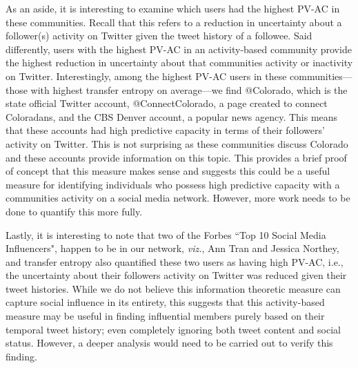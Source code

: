 As an aside, it is interesting to examine which users had the highest PV-AC in these communities. Recall that this refers to a reduction in uncertainty about a follower(s) activity on Twitter given the tweet history of a followee. Said differently, users with the highest PV-AC in an activity-based community provide the highest reduction in uncertainty about that communities activity or inactivity on Twitter.
Interestingly, among the highest PV-AC users in these communities---those with highest transfer entropy on average---we find @Colorado, which is the state official Twitter account, @ConnectColorado, a page created to connect Coloradans, and the CBS Denver account, a popular news agency. This means that these accounts had high predictive capacity in terms of their followers' activity on Twitter. This is not surprising as these communities discuss Colorado and these accounts provide information on this topic. This provides a brief proof of concept that this measure makes sense and suggests this could be a useful measure for identifying individuals who possess high predictive capacity with a communities activity on a social media network. However, more work needs to be done to quantify this more fully. 

Lastly, it is interesting to note that two of the Forbes ``Top 10 Social Media Influencers",
 happen to be in our network, \emph{viz.}, Ann Tran and Jessica Northey, and transfer entropy also quantified these two users as having high PV-AC, i.e., the uncertainty about their followers activity on Twitter was reduced given their tweet histories. While we do not believe this information theoretic measure can capture social influence in its entirety, 
this suggests that this activity-based measure may be useful in finding influential members purely based on their temporal tweet history; even completely ignoring both tweet content and social status. However, a deeper analysis would need to be carried out to verify this finding. 
